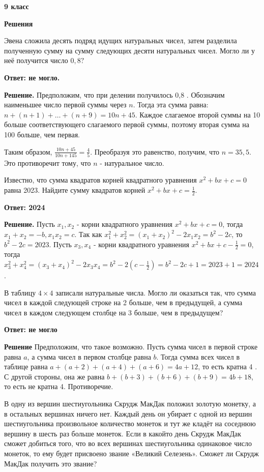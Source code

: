 \centerline{\bf \huge 9 класс}
\centerline{\bf \huge Решения}

Эвена сложила десять подряд идущих натуральных чисел, затем разделила полученную сумму на сумму следующих десяти натуральных чисел. Могло ли у неё получится число $0,8 ?$

\textbf{Ответ: не могло.}

\textbf{Решение.} 
Предположим, что при делении получилось 0,8 . Обозначим наименьшее число первой суммы через $n$. Тогда эта сумма равна: $n+(n+1)+\ldots+(n+9)=10 n+45$. Каждое слагаемое второй суммы на 10 больше соответствующего слагаемого первой суммы, поэтому вторая сумма на 100 больше, чем первая.

Таким образом, $\frac{10 n+45}{10 n+145}=\frac{4}{5}$. Преобразуя это равенство, получим, что $n=35,5$. Это противоречит тому, что $n$ - натуральное число.


Известно, что сумма квадратов корней квадратного уравнения $x^2+b x+ c=0$ равна 2023. Найдите сумму квадратов корней $x^2+b x+c=\frac{1}{2}$.

\textbf{Ответ: 2024}

\textbf{Решение.}
Пусть $x_1, x_2$ - корни квадратного уравнения $x^2+b x+c=0$, тогда $x_1+x_2=-b, x_1 x_2=c$. Так как $x_1^2+x_2^2=\left(x_1+x_2\right)^2-2 x_1 x_2= b^2-2 c$, то $b^2-2 c=2023$. Пусть $x_3, x_4$ - корни квадратного уравнения $x^2+b x+c-\frac{1}{2}=0$, тогда $x_3^2+x_4^2=\left(x_3+x_4\right)^2-2 x_3 x_4=b^2-2\left(c-\frac{1}{2}\right)= b^2-2 c+1=2023+1=2024$.

В таблицу $4 \times 4$ записали натуральные числа. Могло ли оказаться так, что сумма чисел в каждой следующей строке на 2 больше, чем в предыдущей, а сумма чисел в каждом следующем столбце на 3 больше, чем в предыдущем?

\textbf{Ответ: не могло}

\textbf{Решение}
Предположим, что такое возможно. Пусть сумма чисел в первой строке равна $a$, а сумма чисел в первом столбце равна $b$. Тогда сумма всех чисел в таблице равна $a+(a+2)+(a+4)+(a+6)=4 a+12$, то есть кратна 4 . С другой стороны, она же равна $b+(b+3)+(b+6)+(b+9)=4 b+18$, то есть не кратна 4. Противоречие.

В одну из вершин шестиугольника Скрудж МакДак положил золотую монетку, а в остальных вершинах ничего нет. Каждый день он убирает с одной из вершин шестиугольника произвольное количество монеток и тут же кладёт на соседнюю вершину в шесть раз больше монеток. Если в какойто день Скрудж МакДак сможет добиться того, что во всех вершинах шестиугольника одинаковое число монеток, то ему будет присвоено звание «Великий Селезень». Сможет ли Скрудж МакДак получить это звание?


